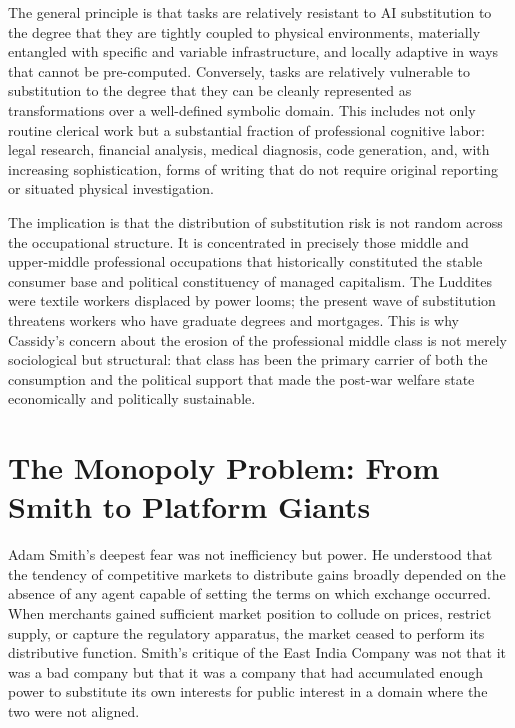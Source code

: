 \documentclass[11pt, a4paper]{article}
\theoremstyle{plain}
\theoremstyle{definition}
\begin{document}
The general principle is that tasks are relatively resistant to AI substitution
to the degree that they are tightly coupled to physical environments,
materially entangled with specific and variable infrastructure, and locally
adaptive in ways that cannot be pre-computed. Conversely, tasks are relatively
vulnerable to substitution to the degree that they can be cleanly represented
as transformations over a well-defined symbolic domain. This includes not only
routine clerical work but a substantial fraction of professional cognitive
labor: legal research, financial analysis, medical diagnosis, code generation,
and, with increasing sophistication, forms of writing that do not require
original reporting or situated physical investigation.

The implication is that the distribution of substitution risk is not random
across the occupational structure. It is concentrated in precisely those
middle and upper-middle professional occupations that historically constituted
the stable consumer base and political constituency of managed capitalism.
The Luddites were textile workers displaced by power looms; the present wave
of substitution threatens workers who have graduate degrees and mortgages.
This is why Cassidy's concern about the erosion of the professional middle
class is not merely sociological but structural: that class has been the
primary carrier of both the consumption and the political support that made
the post-war welfare state economically and politically sustainable.

\section{The Monopoly Problem: From Smith to Platform Giants}

Adam Smith's deepest fear was not inefficiency but power. He understood that
the tendency of competitive markets to distribute gains broadly depended on
the absence of any agent capable of setting the terms on which exchange
occurred. When merchants gained sufficient market position to collude on
prices, restrict supply, or capture the regulatory apparatus, the market
ceased to perform its distributive function. Smith's critique of the East
India Company was not that it was a bad company but that it was a company
that had accumulated enough power to substitute its own interests for public
interest in a domain where the two were not aligned.
\end{document}
